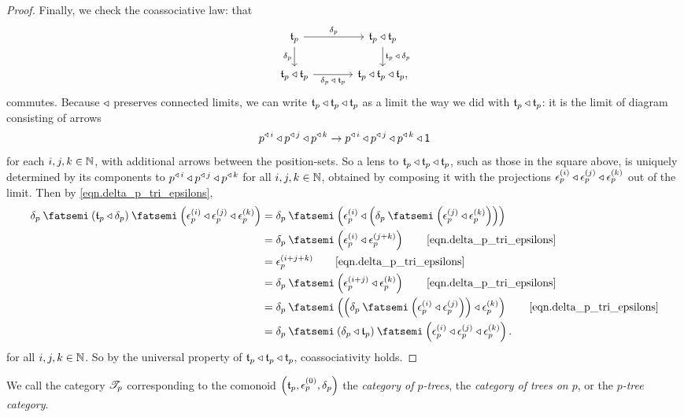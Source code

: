 \documentclass[Book-Poly]{subfiles}
\begin{document}
\begin{proof}
Finally, we check the coassociative law: that
\[
\begin{tikzcd}[column sep=large]
	\ema{t}_p\ar[r, "\delta_p"]\ar[d, "\delta_p"']&
	\ema{t}_p\tri\ema{t}_p\ar[d, "\ema{t}_p\:\tri\:\delta_p"]\\
	\ema{t}_p\tri\ema{t}_p\ar[r, "\delta_p\:\tri\:\ema{t}_p"']&
	\ema{t}_p\tri\ema{t}_p\tri\ema{t}_p,
\end{tikzcd}
\]
commutes.
Because $\mathbin{\triangleleft}$ preserves connected limits, we can write $\mathfrak{t}_p\mathbin{\triangleleft}\mathfrak{t}_p\mathbin{\triangleleft}\mathfrak{t}_p$ as a limit the way we did with $\mathfrak{t}_p\mathbin{\triangleleft}\mathfrak{t}_p$: it is the limit of diagram consisting of arrows
\[
    p^{\mathbin{\triangleleft}\,i}\mathbin{\triangleleft} p^{\mathbin{\triangleleft}\,j}\mathbin{\triangleleft} p^{\mathbin{\triangleleft}\,k}\to p^{\mathbin{\triangleleft}\,i}\mathbin{\triangleleft} p^{\mathbin{\triangleleft}\,j}\mathbin{\triangleleft} p^{\mathbin{\triangleleft}\,k}\mathbin{\triangleleft}\textsf{1}
\]
for each $i,j,k\in\mathbb{N}$, with additional arrows between the position-sets.
So a lens to $\mathfrak{t}_p\mathbin{\triangleleft}\mathfrak{t}_p\mathbin{\triangleleft}\mathfrak{t}_p$, such as those in the square above, is uniquely determined by its components to $p^{\mathbin{\triangleleft}\,i}\mathbin{\triangleleft} p^{\mathbin{\triangleleft}\,j}\mathbin{\triangleleft} p^{\mathbin{\triangleleft}\,k}$ for all $i,j,k\in\mathbb{N}$, obtained by composing it with the projections $\epsilon^{(i)}_p\mathbin{\triangleleft}\epsilon^{(j)}_p\mathbin{\triangleleft}\epsilon^{(k)}_p$ out of the limit.
Then by \eqref{eqn.delta_p_tri_epsilons},
\begin{align*}
    \delta_p\then\left(\ema{t}_p\tri\delta_p\right)\then\left(\epsilon^{(i)}_p\tri\epsilon^{(j)}_p\tri\epsilon^{(k)}_p\right) &=
    \delta_p\then\left(\epsilon^{(i)}_p\tri\left(\delta_p\then\left(\epsilon^{(j)}_p\tri\epsilon^{(k)}_p\right)\right)\right) \\ &=
    \delta_p\then\left(\epsilon^{(i)}_p\tri\epsilon^{(j+k)}_p\right) \tag*{\eqref{eqn.delta_p_tri_epsilons}} \\ &=
    \epsilon^{(i+j+k)}_p \tag*{\eqref{eqn.delta_p_tri_epsilons}} \\ &=
    \delta_p\then\left(\epsilon^{(i+j)}_p\tri\epsilon^{(k)}_p\right) \tag*{\eqref{eqn.delta_p_tri_epsilons}} \\ &=
    \delta_p\then\left(\left(\delta_p\then\left(\epsilon^{(i)}_p\tri\epsilon^{(j)}_p\right)\right)\tri\epsilon^{(k)}_p\right) \tag*{\eqref{eqn.delta_p_tri_epsilons}} \\ &=
    \delta_p\then\left(\delta_p\tri\ema{t}_p\right)\then\left(\epsilon^{(i)}_p\tri\epsilon^{(j)}_p\tri\epsilon^{(k)}_p\right).
\end{align*}
for all $i,j,k\in\mathbb{N}$.
So by the universal property of $\mathfrak{t}_p\mathbin{\triangleleft}\mathfrak{t}_p\mathbin{\triangleleft}\mathfrak{t}_p$, coassociativity holds.
\end{proof}

We call the category $\mathscr{T}_{p}$ corresponding to the comonoid $\left(\mathfrak{t}_p,\epsilon^{(0)}_p,\delta_p\right)$ the \emph{category of $p$-trees}, the \emph{category of trees on $p$}, or the \emph{$p$-tree category}.
\end{document}
